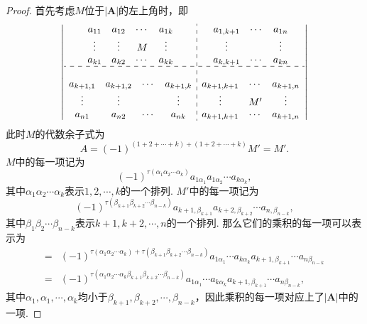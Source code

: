 \documentclass{article}
\newcommand{\mbf}[1]{\bm{#1}}
\begin{document}
\begin{proof}
首先考虑$M$位于$|\mbf{A}|$的左上角时，即
$$
\left|
\begin{array}{c:c}
\begin{matrix}
a_{11} & a_{12} & \cdots & a_{1k} \\
\vdots & \vdots & M & \vdots \\
a_{k1} & a_{k2} & \cdots & a_{kk} 
\end{matrix} &
\begin{matrix}
a_{1,k+1} & \cdots  & a_{1n} \\ 
\vdots &  & \vdots \\
a_{k,k+1} &  \cdots & a_{kn} 
\end{matrix} \\
\hdashline \\
\begin{matrix}
a_{k+1,1} & a_{k+1,2} & \cdots & a_{k+1,k} \\
\vdots & \vdots &  & \vdots \\
a_{n1} & a_{n2} & \cdots & a_{nk} 
\end{matrix} &
\begin{matrix}
a_{k+1,k+1} & \cdots  & a_{k+1,n} \\ 
\vdots & M' & \vdots \\
a_{k+1,k+1} &  \cdots & a_{k+1,n} 
\end{matrix} \\
\end{array} \right|
$$
此时$M$的代数余子式为
$$
A = (-1)^{(1+2+\cdots+k) + (1+2+\cdots+k)}M' = M'.
$$
$M$中的每一项记为
$$
(-1)^{\tau(\alpha_1\alpha_2\cdots\alpha_k)}a_{1\alpha_1}a_{1\alpha_2}\cdots a_{k\alpha_k},
$$
其中$\alpha_1\alpha_2\cdots\alpha_k$表示$1,2,\cdots,k$的一个排列.
$M'$中的每一项记为
$$
(-1)^{\tau(\beta_{k+1}\beta_{k+2}\cdots\beta_{n-k})}a_{k+1,\beta_{k+1}}a_{k+2,\beta_{k+2}}\cdots a_{n,\beta_{n-k}},
$$
其中$\beta_1\beta_2\cdots\beta_{n-k}$表示$k+1,k+2,\cdots,n$的一个排列. 那么它们的乘积的每一项可以表示为
$$
\begin{array}{ll}
=&(-1)^{\tau(\alpha_1\alpha_2\cdots\alpha_k) + \tau(\beta_{k+1}\beta_{k+2}\cdots\beta_{n-k})} a_{1\alpha_1}\cdots a_{k\alpha_k}a_{k+1,\beta_{k+1}}\cdots a_{n\beta_{n-k}} \\
=&(-1)^{\tau(\alpha_1\alpha_2\cdots\alpha_k\beta_{k+1}\beta_{k+2}\cdots\beta_{n-k})} a_{1\alpha_1}\cdots a_{k\alpha_k}a_{k+1,\beta_{k+1}}\cdots a_{n\beta_{n-k}},
\end{array}
$$
其中$\alpha_1,\alpha_1,\cdots,\alpha_k$均小于$\beta_{k+1},\beta_{k+2},\cdots,\beta_{n-k}$，因此乘积的每一项对应上了$|\mbf{A}|$中的一项. 


\end{proof}
\end{document}
